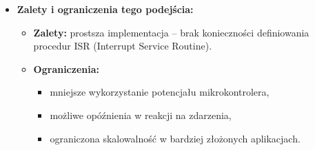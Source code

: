 \begin{itemize}
    \item \textbf{Zalety i ograniczenia tego podejścia:}
    \begin{itemize}
        \item \textbf{Zalety:} prostsza implementacja – brak konieczności definiowania procedur ISR (Interrupt Service Routine).
        \item \textbf{Ograniczenia:}
        \begin{itemize}
            \item mniejsze wykorzystanie potencjału mikrokontrolera,
            \item możliwe opóźnienia w reakcji na zdarzenia,
            \item ograniczona skalowalność w bardziej złożonych aplikacjach.
        \end{itemize}
    \end{itemize}
\end{itemize}






